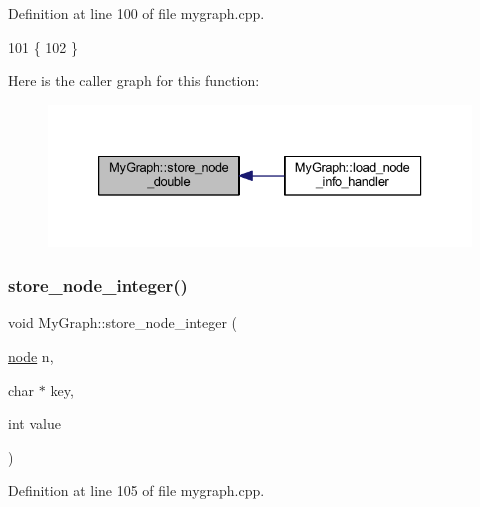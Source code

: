 Definition at line 100 of file mygraph.\+cpp.


\begin{DoxyCode}
101 \{
102 \}
\end{DoxyCode}
Here is the caller graph for this function\+:
\nopagebreak
\begin{figure}[H]
\begin{center}
\leavevmode
\includegraphics[width=333pt]{class_my_graph_a16b037dbb0011fc50367145c477ac7a4_icgraph}
\end{center}
\end{figure}
\mbox{\label{class_my_graph_a4f5922407f2f3fac566d1045d98da46f}} 
\subsubsection{\texorpdfstring{store\+\_\+node\+\_\+integer()}{store\_node\_integer()}}
{\footnotesize\ttfamily void My\+Graph\+::store\+\_\+node\+\_\+integer (\begin{DoxyParamCaption}\item[{\mbox{\hyperlink{classnode}{node}}}]{n,  }\item[{char $\ast$}]{key,  }\item[{int}]{value }\end{DoxyParamCaption})\hspace{0.3cm}{\ttfamily [virtual]}}



Definition at line 105 of file mygraph.\+cpp.


